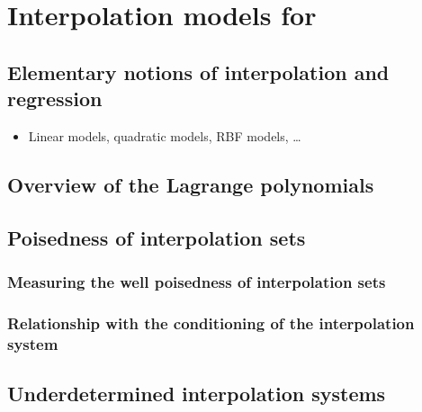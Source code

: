 %
%
%

\chapter{Interpolation models for }

\section{Elementary notions of interpolation and regression}

\begin{itemize}
    \item Linear models, quadratic models, RBF models, \dots
\end{itemize}

\section{Overview of the Lagrange polynomials}

\section{Poisedness of interpolation sets}

\subsection{Measuring the well poisedness of interpolation sets}

\subsection{Relationship with the conditioning of the interpolation system}

\section{Underdetermined interpolation systems}

